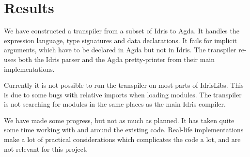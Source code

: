 \chapter{Results}

%



We have constructed a transpiler from a subset of Idris to Agda. It handles the
expression language, type signatures and data declarations.  It fails for
implicit arguments, which have to be declared in Agda but not in Idris. The
transpiler re-uses both the Idris parser and the Agda pretty-printer from their
main implementations.

Currently it is not possible to run the transpiler on most parts of IdrisLibs.
This is due to some bugs with relative imports when loading modules. The
transpiler is not searching for modules in the same places as the main Idris
compiler.

We have made some progress, but not as much as planned. It has taken quite some
time working with and around the existing code.  Real-life implementations make
a lot of practical considerations which complicates the code a lot, and are not
relevant for this project.


